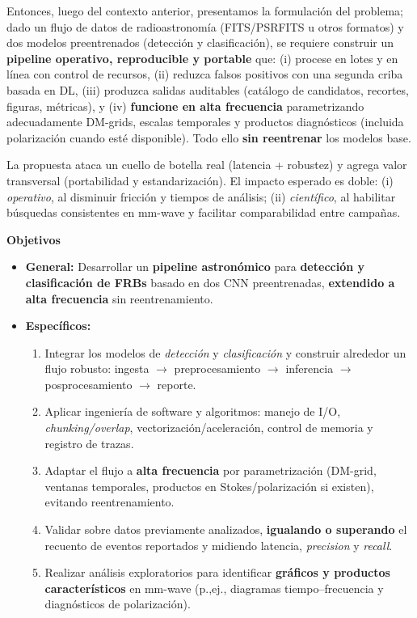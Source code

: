 \medskip
Entonces, luego del contexto anterior, presentamos la formulación del problema; dado un flujo de datos de radioastronomía (FITS/PSRFITS u otros formatos) y dos modelos preentrenados (detección y clasificación), se requiere construir un \textbf{pipeline operativo, reproducible y portable} que: (i) procese en lotes y en línea con control de recursos, (ii) reduzca falsos positivos con una segunda criba basada en DL, (iii) produzca salidas auditables (catálogo de candidatos, recortes, figuras, métricas), y (iv) \textbf{funcione en alta frecuencia} parametrizando adecuadamente DM-grids, escalas temporales y productos diagnósticos (incluida polarización cuando esté disponible). Todo ello \textbf{sin reentrenar} los modelos base.

\medskip
La propuesta ataca un cuello de botella real (latencia + robustez) y agrega valor transversal (portabilidad y estandarización). El impacto esperado es doble: (i) \emph{operativo}, al disminuir fricción y tiempos de análisis; (ii) \emph{científico}, al habilitar búsquedas consistentes en mm-wave y facilitar comparabilidad entre campañas.

\medskip
\noindent\textbf{Objetivos}
\begin{itemize}
\item \textbf{General:} Desarrollar un \textbf{pipeline astronómico} para \textbf{detección y clasificación de FRBs} basado en dos CNN preentrenadas, \textbf{extendido a alta frecuencia} sin reentrenamiento.
\item \textbf{Específicos:}
\begin{enumerate}
\item Integrar los modelos de \emph{detección} y \emph{clasificación} y construir alrededor un flujo robusto: ingesta $\to$ preprocesamiento $\to$ inferencia $\to$ posprocesamiento $\to$ reporte.
\item Aplicar ingeniería de software y algoritmos: manejo de I/O, \emph{chunking/overlap}, vectorización/aceleración, control de memoria y registro de trazas.
\item Adaptar el flujo a \textbf{alta frecuencia} por parametrización (DM-grid, ventanas temporales, productos en Stokes/polarización si existen), evitando reentrenamiento.
\item Validar sobre datos previamente analizados, \textbf{igualando o superando} el recuento de eventos reportados y midiendo latencia, \emph{precision} y \emph{recall}.
\item Realizar análisis exploratorios para identificar \textbf{gráficos y productos característicos} en mm-wave (p.,ej., diagramas tiempo--frecuencia y diagnósticos de polarización).
\end{enumerate}
\end{itemize}

